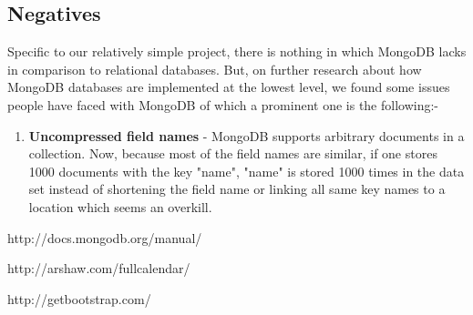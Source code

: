 \documentclass[twocolumn]{article}
\begin{document}
\subsection*{Negatives} 
Specific to our relatively simple project, there is nothing in which MongoDB lacks in comparison to relational databases. \newline 
But, on further research about how MongoDB databases are implemented at the lowest level, we found some issues people have faced with MongoDB of which a prominent one is the following:-
\begin{enumerate}
\item \textbf{Uncompressed field names} - MongoDB supports arbitrary documents in a collection. Now, because most of the field names are similar, if one stores 1000 documents with the key "name", "name" is stored 1000 times in the data set instead of shortening the field name or linking all same key names to a location which seems an overkill.
\end{enumerate}

%
%
\begin{thebibliography}{9}


http://docs.mongodb.org/manual/

http://arshaw.com/fullcalendar/

 http://getbootstrap.com/


\end{thebibliography}
\end{document}
